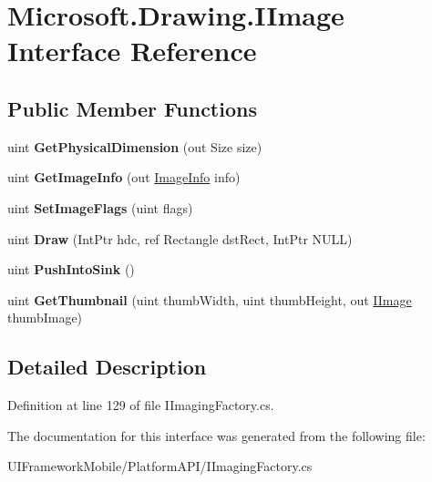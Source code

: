 \hypertarget{interface_microsoft_1_1_drawing_1_1_i_image}{
\section{Microsoft.Drawing.IImage Interface Reference}
\label{interface_microsoft_1_1_drawing_1_1_i_image}
}
\subsection*{Public Member Functions}
\begin{DoxyCompactItemize}
\item 
\hypertarget{interface_microsoft_1_1_drawing_1_1_i_image_a451c3fc9b3cd8df281637043c85a66d6}{
uint {\bfseries GetPhysicalDimension} (out Size size)}
\label{interface_microsoft_1_1_drawing_1_1_i_image_a451c3fc9b3cd8df281637043c85a66d6}

\item 
\hypertarget{interface_microsoft_1_1_drawing_1_1_i_image_ac5b1ff8cd89402d563dc219bcaa842c9}{
uint {\bfseries GetImageInfo} (out \hyperlink{struct_microsoft_1_1_drawing_1_1_image_info}{ImageInfo} info)}
\label{interface_microsoft_1_1_drawing_1_1_i_image_ac5b1ff8cd89402d563dc219bcaa842c9}

\item 
\hypertarget{interface_microsoft_1_1_drawing_1_1_i_image_acdc3fe9b8894a5c1829db39d4b939181}{
uint {\bfseries SetImageFlags} (uint flags)}
\label{interface_microsoft_1_1_drawing_1_1_i_image_acdc3fe9b8894a5c1829db39d4b939181}

\item 
\hypertarget{interface_microsoft_1_1_drawing_1_1_i_image_ada3fa0d511e6203f5a28d68429f9eeee}{
uint {\bfseries Draw} (IntPtr hdc, ref Rectangle dstRect, IntPtr NULL)}
\label{interface_microsoft_1_1_drawing_1_1_i_image_ada3fa0d511e6203f5a28d68429f9eeee}

\item 
\hypertarget{interface_microsoft_1_1_drawing_1_1_i_image_ada9ade7d65947ffe1b745ddd59db266b}{
uint {\bfseries PushIntoSink} ()}
\label{interface_microsoft_1_1_drawing_1_1_i_image_ada9ade7d65947ffe1b745ddd59db266b}

\item 
\hypertarget{interface_microsoft_1_1_drawing_1_1_i_image_aa8f7a8519c46bac502a12854859ccd4b}{
uint {\bfseries GetThumbnail} (uint thumbWidth, uint thumbHeight, out \hyperlink{interface_microsoft_1_1_drawing_1_1_i_image}{IImage} thumbImage)}
\label{interface_microsoft_1_1_drawing_1_1_i_image_aa8f7a8519c46bac502a12854859ccd4b}

\end{DoxyCompactItemize}


\subsection{Detailed Description}


Definition at line 129 of file IImagingFactory.cs.

The documentation for this interface was generated from the following file:\begin{DoxyCompactItemize}
\item 
UIFrameworkMobile/PlatformAPI/IImagingFactory.cs\end{DoxyCompactItemize}
